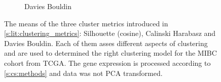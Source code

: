 \begin{figure}[!h]
\begin{subfigure}[!t]{0.3\textwidth}
        \caption{Davies Bouldin}
        \label{fig:ap:dav_boul}
    \end{subfigure}
    \caption{The means of the three cluster metrics introduced in \cref{s:lit:clustering_metrics}: Silhouette (cosine), Calinski Harabasz and Davies Bouldin. Each of them asses different aspects of clustering and are used to determined the right clustering model for the MIBC cohort from TCGA. The gene expression is processed according to \cref{s:cs:methods} and data was not PCA transformed.}
    \label{fig:ap:non_pca_metrics}
\end{figure}
